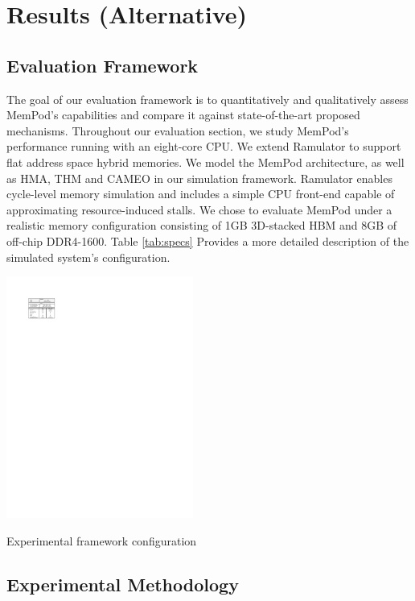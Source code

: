 \section{Results (Alternative)}
\label{sec:Results}

\subsection{Evaluation Framework}
\label{sub:Evaluation}

The goal of our evaluation framework is to quantitatively and qualitatively assess MemPod's capabilities and compare it against state-of-the-art proposed mechanisms. Throughout our evaluation section, we study MemPod's performance running with an eight-core CPU. We extend Ramulator \cite{kim-ramulator} to support flat address space hybrid memories. We model the MemPod architecture,
as well as HMA, THM and CAMEO in our simulation framework. Ramulator enables 
cycle-level memory simulation and includes a simple CPU front-end capable of approximating resource-induced stalls. We chose to evaluate MemPod under a realistic memory configuration consisting of 1GB 3D-stacked HBM \cite{JEDEC-HBM-REVISED} and 8GB of off-chip DDR4-1600. Table \ref{tab:specs} Provides a more detailed description of the simulated system's configuration.

\begin{table}[t]
  \includegraphics[width=0.46\textwidth]{figures/specs_table.pdf}
  \caption{Experimental framework configuration}
  \label{tab:specs}
\end{table}

\subsection{Experimental Methodology}
\label{sub:Experimental}


